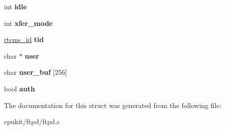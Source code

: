 \begin{DoxyCompactItemize}
int {\bfseries idle}
\item 
\mbox{\label{structFTPD__SessionInfo__t_a4afd2081a7c182491e4a40bfab1f3755}} 
int {\bfseries xfer\+\_\+mode}
\item 
\mbox{\label{structFTPD__SessionInfo__t_ac62e58b033a3a3d2b671ed59b3db261e}} 
\mbox{\hyperlink{group__ClassicTasks_gab20892b814dced7dd4e5b9bf42becd57}{rtems\+\_\+id}} {\bfseries tid}
\item 
\mbox{\label{structFTPD__SessionInfo__t_a82c2112044617d082f24c24138961bda}} 
char $\ast$ {\bfseries user}
\item 
\mbox{\label{structFTPD__SessionInfo__t_a69b7d4691fe900a2e4e0ac752eafd7d6}} 
char {\bfseries user\+\_\+buf} \mbox{[}256\mbox{]}
\item 
\mbox{\label{structFTPD__SessionInfo__t_aa2fa2bf12a6a72fe0a845146137b0bc6}} 
bool {\bfseries auth}
\end{DoxyCompactItemize}


The documentation for this struct was generated from the following file\+:\begin{DoxyCompactItemize}
\item 
cpukit/ftpd/ftpd.\+c\end{DoxyCompactItemize}
